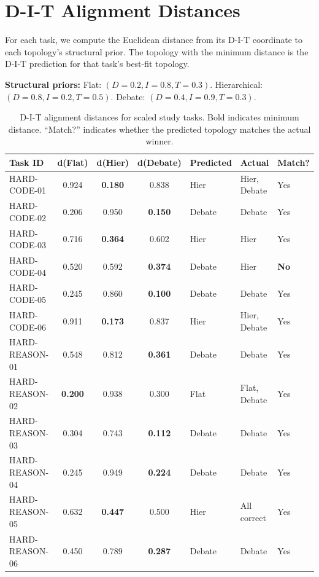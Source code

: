 \section{D-I-T Alignment Distances}
\label{app:alignment}

For each task, we compute the Euclidean distance from its D-I-T coordinate to each topology's structural prior. The topology with the minimum distance is the D-I-T prediction for that task's best-fit topology.

\textbf{Structural priors:} Flat: $(D=0.2, I=0.8, T=0.3)$. Hierarchical: $(D=0.8, I=0.2, T=0.5)$. Debate: $(D=0.4, I=0.9, T=0.3)$.

\begin{table}[h]
\centering
\caption{D-I-T alignment distances for scaled study tasks. Bold indicates minimum distance. ``Match?'' indicates whether the predicted topology matches the actual winner.}
\label{tab:alignment_distances}
\scriptsize
\begin{tabular}{lccclll}
\toprule
\textbf{Task ID} & \textbf{d(Flat)} & \textbf{d(Hier)} & \textbf{d(Debate)} & \textbf{Predicted} & \textbf{Actual} & \textbf{Match?} \\
\midrule
HARD-CODE-01 & 0.924 & \textbf{0.180} & 0.838 & Hier & Hier, Debate & Yes \\
HARD-CODE-02 & 0.206 & 0.950 & \textbf{0.150} & Debate & Debate & Yes \\
HARD-CODE-03 & 0.716 & \textbf{0.364} & 0.602 & Hier & Hier & Yes \\
HARD-CODE-04 & 0.520 & 0.592 & \textbf{0.374} & Debate & Hier & \textbf{No} \\
HARD-CODE-05 & 0.245 & 0.860 & \textbf{0.100} & Debate & Debate & Yes \\
HARD-CODE-06 & 0.911 & \textbf{0.173} & 0.837 & Hier & Hier, Debate & Yes \\
HARD-REASON-01 & 0.548 & 0.812 & \textbf{0.361} & Debate & Debate & Yes \\
HARD-REASON-02 & \textbf{0.200} & 0.938 & 0.300 & Flat & Flat, Debate & Yes \\
HARD-REASON-03 & 0.304 & 0.743 & \textbf{0.112} & Debate & Debate & Yes \\
HARD-REASON-04 & 0.245 & 0.949 & \textbf{0.224} & Debate & Debate & Yes \\
HARD-REASON-05 & 0.632 & \textbf{0.447} & 0.500 & Hier & All correct & Yes \\
HARD-REASON-06 & 0.450 & 0.789 & \textbf{0.287} & Debate & Debate & Yes \\

\end{tabular}
\end{table}
